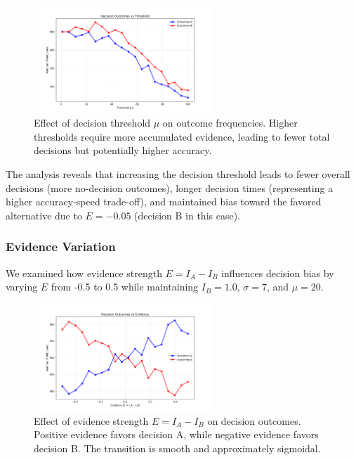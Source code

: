 \documentclass[11pt,a4paper]{article}
\begin{document}
\begin{figure}[H]
    \centering
    \includegraphics[width=0.6\textwidth]{ddm_threshold_variation.png}
    \caption{Effect of decision threshold $\mu$ on outcome frequencies. Higher thresholds require more accumulated evidence, leading to fewer total decisions but potentially higher accuracy.}
    \label{fig:threshold_variation}
\end{figure}

The analysis reveals that increasing the decision threshold leads to fewer overall decisions (more no-decision outcomes), longer decision times (representing a higher accuracy-speed trade-off), and maintained bias toward the favored alternative due to $E=-0.05$ (decision B in this case). 

\subsubsection*{Evidence Variation}

We examined how evidence strength $E = I_A - I_B$ influences decision bias by varying $E$ from -0.5 to 0.5 while maintaining $I_B = 1.0$, $\sigma = 7$, and $\mu = 20$.

\begin{figure}[H]
    \centering
    \includegraphics[width=0.6\textwidth]{ddm_evidence_variation.png}
    \caption{Effect of evidence strength $E = I_A - I_B$ on decision outcomes. Positive evidence favors decision A, while negative evidence favors decision B. The transition is smooth and approximately sigmoidal.}
    \label{fig:evidence_variation}
\end{figure}
\end{document}
